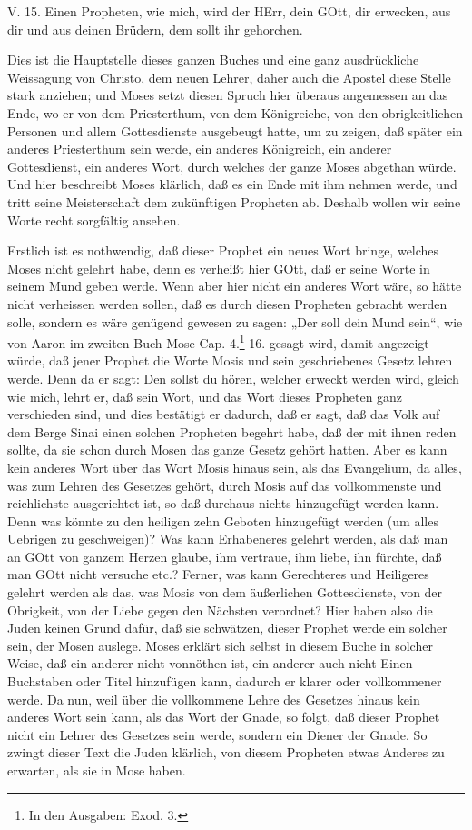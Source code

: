 \begin{schriftzitat}
V. 15. Einen Propheten, wie mich, wird der HErr, dein GOtt, dir erwecken, aus dir und aus deinen Brüdern, dem sollt ihr gehorchen.
\end{schriftzitat}

Dies ist die Hauptstelle dieses ganzen Buches und eine ganz ausdrückliche Weissagung von Christo, dem neuen Lehrer, daher auch die Apostel diese Stelle stark anziehen; und Moses setzt diesen Spruch hier überaus angemessen an das Ende, wo er von dem Priesterthum, von dem Königreiche, von den obrigkeitlichen Personen und allem Gottesdienste ausgebeugt hatte, um zu zeigen, daß später ein anderes Priesterthum sein werde, ein anderes Königreich, ein anderer Gottesdienst, ein anderes Wort, durch welches der ganze Moses abgethan würde. Und hier beschreibt Moses klärlich, daß es ein Ende mit ihm nehmen werde, und tritt seine Meisterschaft dem zukünftigen Propheten ab. Deshalb wollen wir seine Worte recht sorgfältig ansehen.

Erstlich ist es nothwendig, daß dieser Prophet ein neues Wort bringe, welches Moses nicht gelehrt habe, denn es verheißt hier GOtt, daß er seine Worte in seinem Mund geben werde. Wenn aber hier nicht ein anderes Wort wäre, so hätte nicht verheissen werden sollen, daß es durch diesen Propheten gebracht werden solle, sondern es wäre genügend gewesen zu sagen: „Der soll dein Mund sein“, wie von Aaron im zweiten Buch Mose Cap. 4.\footnote{In den Ausgaben: Exod. 3.} 16. gesagt wird, damit angezeigt würde, daß jener Prophet die Worte Mosis und sein geschriebenes Gesetz lehren werde. Denn da er sagt: Den sollst du hören, welcher erweckt werden wird, gleich wie mich, lehrt er, daß sein Wort, und das Wort dieses Propheten ganz verschieden sind, und dies bestätigt er dadurch, daß er sagt, daß das Volk auf dem Berge Sinai einen solchen Propheten begehrt habe, daß der mit ihnen reden sollte, da sie schon durch Mosen das ganze Gesetz gehört hatten. Aber es kann kein anderes Wort über das Wort Mosis hinaus sein, als das Evangelium, da alles, was zum Lehren des Gesetzes gehört, durch Mosis auf das vollkommenste und reichlichste ausgerichtet ist, so daß durchaus nichts hinzugefügt werden kann. Denn was könnte zu den heiligen zehn Geboten hinzugefügt werden (um alles Uebrigen zu geschweigen)? Was kann Erhabeneres gelehrt werden, als daß man an GOtt von ganzem Herzen glaube, ihm vertraue, ihm liebe, ihn fürchte, daß man GOtt nicht versuche etc.? Ferner, was kann Gerechteres und Heiligeres gelehrt werden als das, was Mosis von dem äußerlichen Gottesdienste, von der Obrigkeit, von der Liebe gegen den Nächsten verordnet? Hier haben also die Juden keinen Grund dafür, daß sie schwätzen, dieser Prophet werde ein solcher sein, der Mosen auslege. Moses erklärt sich selbst in diesem Buche in solcher Weise, daß ein anderer nicht vonnöthen ist, ein anderer auch nicht Einen Buchstaben oder Titel hinzufügen kann, dadurch er klarer oder vollkommener werde. Da nun, weil über die vollkommene Lehre des Gesetzes hinaus kein anderes Wort sein kann, als das Wort der Gnade, so folgt, daß dieser Prophet nicht ein Lehrer des Gesetzes sein werde, sondern ein Diener der Gnade. So zwingt dieser Text die Juden klärlich, von diesem Propheten etwas Anderes zu erwarten, als sie in Mose haben.

